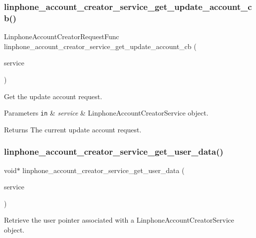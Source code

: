 \subsubsection{linphone\+\_\+account\+\_\+creator\+\_\+service\+\_\+get\+\_\+update\+\_\+account\+\_\+cb()}
{\footnotesize\ttfamily Linphone\+Account\+Creator\+Request\+Func linphone\+\_\+account\+\_\+creator\+\_\+service\+\_\+get\+\_\+update\+\_\+account\+\_\+cb (\begin{DoxyParamCaption}\item[{const \textbf{ Linphone\+Account\+Creator\+Service} $\ast$}]{service }\end{DoxyParamCaption})}



Get the update account request. 


\begin{DoxyParams}[1]{Parameters}
\mbox{\tt in}  & {\em service} & Linphone\+Account\+Creator\+Service object. \\
\hline
\end{DoxyParams}
\begin{DoxyReturn}{Returns}
The current update account request.  
\end{DoxyReturn}
\mbox{\label{group__account__creator__request_gabeea4b290c06e56f14a18be8512dbc41}} 
\subsubsection{linphone\+\_\+account\+\_\+creator\+\_\+service\+\_\+get\+\_\+user\+\_\+data()}
{\footnotesize\ttfamily void$\ast$ linphone\+\_\+account\+\_\+creator\+\_\+service\+\_\+get\+\_\+user\+\_\+data (\begin{DoxyParamCaption}\item[{const \textbf{ Linphone\+Account\+Creator\+Service} $\ast$}]{service }\end{DoxyParamCaption})}



Retrieve the user pointer associated with a Linphone\+Account\+Creator\+Service object. 


